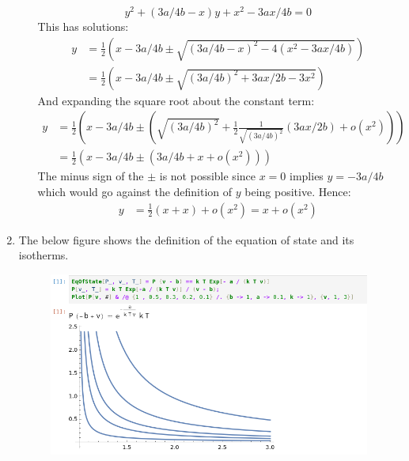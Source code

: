 \documentclass[12pt,a4]{article}
\begin{document}
\begin{enumerate}
\begin{enumerate}
\begin{equation*}
          y^2 + (3a/4b - x)y + x^2 - 3a x/4b = 0
        \end{equation*}
        This has solutions:
        \begin{align*}
          y &= \frac{1}{2}\left(x - 3a / 4b \pm \sqrt{(3a/4b - x)^2 - 4 (x^2 - 3a x / 4b)} \right)\\
            &= \frac{1}{2}\left(x - 3a / 4b \pm \sqrt{(3a/4b)^2 + 3a x / 2b - 3x^2} \right)
        \end{align*}
        And expanding the square root about the constant term:
        \begin{align*}
          y &= \frac{1}{2}\left(x - 3a / 4b \pm \left(\sqrt{(3a/4b)^2 } + \frac{1}{2}\frac{1}{\sqrt{(3a/4b)^2 }}( 3a x / 2b ) + o (x^2)\right) \right)\\
            &= \frac{1}{2}\left(x - 3a / 4b \pm \left(3a/4b +  x + o (x^2)\right) \right)
        \end{align*}
        The minus sign of the $\pm$ is not possible since $x = 0$ implies $y = -3a / 4b$ which would go against the definition of $y$ being positive.
        Hence:
        \begin{align*}
          y &= \frac{1}{2}(x + x)  +  o (x^2) = x +  o (x^2)
        \end{align*}
    \end{enumerate}
  \item
    The below figure shows the definition of the equation of state and its isotherms.
    \begin{figure}[H]
      \begin{center}
        \includegraphics[scale = 0.8]{graphsAndDefinitions.png}
      \end{center}
    \end{figure}


\end{enumerate}
\end{document}
